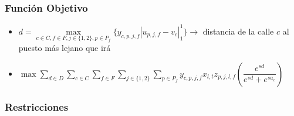 \documentclass[12pt]{article}
\newcommand{\ra}{\rightarrow}
\begin{document}
\subsubsection*{Función Objetivo}
\begin{itemize}
\item[] $d = \max\limits_{c \in C, f \in F, j \in \{1,2\}, p \in P_f}\{ y_{c,p,j,f} |u_{p,j,f} - v_c|_1^1 \} \ra$ distancia de la calle $c$ al puesto más lejano que irá\\
\item[]$\max 
\displaystyle\sum\limits_{d \in D}
\sum\limits_{c \in C}
\sum\limits_{f \in F} 
\sum\limits_{j \in \{1,2\}} 
\sum\limits_{p \in P_f} 
y_{c,p,j,f} x_{l,t} z_{p,j,l,f} \left( \dfrac{e^{sd}}{e^{sd} + e^{sa_c}}\right)$
\end{itemize}
\subsubsection*{Restricciones}
\end{document}
